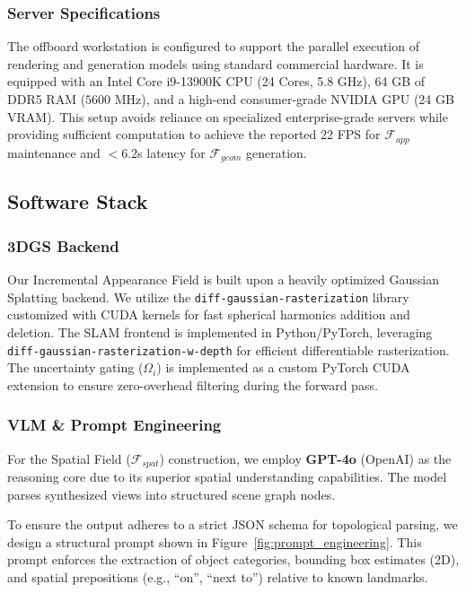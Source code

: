 \documentclass[conference]{IEEEtran}
\begin{document}
\subsubsection{Server Specifications}
The offboard workstation is configured to support the parallel execution of rendering and generation models using standard commercial hardware. It is equipped with an Intel Core i9-13900K CPU (24 Cores, 5.8 GHz), 64 GB of DDR5 RAM ($5600$ MHz), and a high-end consumer-grade NVIDIA GPU (24 GB VRAM). This setup avoids reliance on specialized enterprise-grade servers while providing sufficient computation to achieve the reported 22 FPS for $\mathcal{F}_{app}$ maintenance and $<6.2$s latency for $\mathcal{F}_{geom}$ generation.

\subsection{Software Stack}



\subsubsection{3DGS Backend}

Our Incremental Appearance Field is built upon a heavily optimized Gaussian Splatting backend. We utilize the \texttt{diff-gaussian-rasterization} library customized with CUDA kernels for fast spherical harmonics addition and deletion. The SLAM frontend is implemented in Python/PyTorch, leveraging \texttt{diff-gaussian-rasterization-w-depth} for efficient differentiable rasterization. The uncertainty gating ($\Omega_i$) is implemented as a custom PyTorch CUDA extension to ensure zero-overhead filtering during the forward pass.



\subsubsection{VLM \& Prompt Engineering}

For the Spatial Field ($\mathcal{F}_{spat}$) construction, we employ \textbf{GPT-4o} (OpenAI) as the reasoning core due to its superior spatial understanding capabilities. The model parses synthesized views into structured scene graph nodes. 



To ensure the output adheres to a strict JSON schema for topological parsing, we design a structural prompt shown in Figure~\ref{fig:prompt_engineering}. This prompt enforces the extraction of object categories, bounding box estimates (2D), and spatial prepositions (e.g., ``on'', ``next to'') relative to known landmarks.
\end{document}
